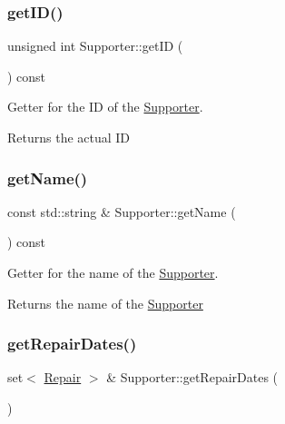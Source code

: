 \subsubsection{\texorpdfstring{get\+I\+D()}{getID()}}
{\footnotesize\ttfamily unsigned int Supporter\+::get\+ID (\begin{DoxyParamCaption}{ }\end{DoxyParamCaption}) const}



Getter for the ID of the \mbox{\hyperlink{class_supporter}{Supporter}}. 

\begin{DoxyReturn}{Returns}
the actual ID 
\end{DoxyReturn}
\mbox{\label{class_supporter_a234ec754b73df8cf526fffbf8724b02c}} 
\subsubsection{\texorpdfstring{get\+Name()}{getName()}}
{\footnotesize\ttfamily const std\+::string \& Supporter\+::get\+Name (\begin{DoxyParamCaption}{ }\end{DoxyParamCaption}) const}



Getter for the name of the \mbox{\hyperlink{class_supporter}{Supporter}}. 

\begin{DoxyReturn}{Returns}
the name of the \mbox{\hyperlink{class_supporter}{Supporter}} 
\end{DoxyReturn}
\mbox{\label{class_supporter_a8fd8a2c698c2ae3979640a213001c20b}} 
\subsubsection{\texorpdfstring{get\+Repair\+Dates()}{getRepairDates()}}
{\footnotesize\ttfamily set$<$ \mbox{\hyperlink{class_repair}{Repair}} $>$ \& Supporter\+::get\+Repair\+Dates (\begin{DoxyParamCaption}{ }\end{DoxyParamCaption})}



